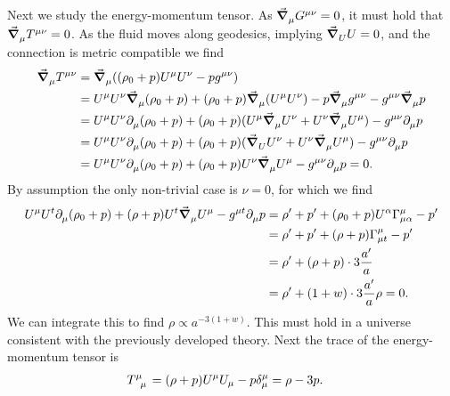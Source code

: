 Next we study the energy-momentum tensor. As $\grad_{\mu}^{}{G^{\mu\nu}} = 0$, it must hold that $\grad_{\mu}^{}{T^{\mu\nu}} = 0$. As the fluid moves along geodesics, implying $\grad_{U}^{}{U} = 0$, and the connection is metric compatible we find
\begin{align*}
	\grad_{\mu}^{}{T^{\mu\nu}} &= \grad_{\mu}^{}{((\rho_{0} + p)U^{\mu}U^{\nu} - pg^{\mu\nu})} \\
	                       &= U^{\mu}U^{\nu}\grad_{\mu}^{}{(\rho_{0} + p)} + (\rho_{0} + p)\grad_{\mu}^{}{(U^{\mu}U^{\nu})} - p\grad_{\mu}^{}{g^{\mu\nu}} - g^{\mu\nu}\grad_{\mu}^{}{p} \\
	                       &= U^{\mu}U^{\nu}\partial^{}_{\mu}(\rho_{0} + p) + (\rho_{0} + p)(U^{\mu}\grad_{\mu}^{}{U^{\nu}} + U^{\nu}\grad_{\mu}^{}{U^{\mu}}) - g^{\mu\nu}\partial^{}_{\mu}p \\
	                       &= U^{\mu}U^{\nu}\partial^{}_{\mu}(\rho_{0} + p) + (\rho_{0} + p)(\grad_{U}^{}{U^{\nu}} + U^{\nu}\grad_{\mu}^{}{U^{\mu}}) - g^{\mu\nu}\partial^{}_{\mu}p \\
	                       &= U^{\mu}U^{\nu}\partial^{}_{\mu}(\rho_{0} + p) + (\rho_{0} + p)U^{\nu}\grad_{\mu}^{}{U^{\mu}} - g^{\mu\nu}\partial^{}_{\mu}p = 0.
\end{align*}
By assumption the only non-trivial case is $\nu = 0$, for which we find
\begin{align*}
	U^{\mu}U^{t}\del{\mu}{(\rho_{0} + p)} + (\rho + p)U^{t}\dcov{\mu}{U^{\mu}} - g^{\mu t}\del{\mu}{p} &= \rho\p + p\p + (\rho_{0} + p)U^{\alpha}\chris{\mu}{\mu}{\alpha} - p\p \\
	               &= \rho\p + p\p + (\rho + p)\chris{\mu}{\mu}{t} - p\p \\
	               &= \rho\p + (\rho + p)\cdot 3\frac{a\p}{a} \\
	               &= \rho\p + (1 + w)\cdot 3\frac{a\p}{a}\rho = 0.
\end{align*}
We can integrate this to find $\rho\propto a^{-3(1 + w)}$. This must hold in a universe consistent with the previously developed theory. Next the trace of the energy-momentum tensor is
\begin{align*}
	\tensor{T}{^{\mu}_{\mu}} &= (\rho + p)U^{\mu}U_{\mu} - p\kdelta{\mu}{\mu} = \rho - 3p.
\end{align*}

